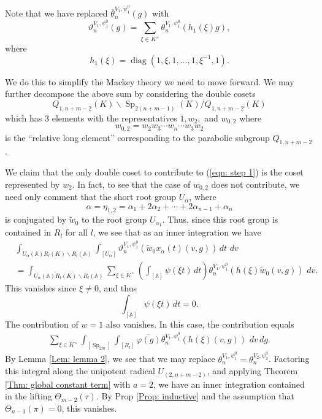 \documentclass[11pt,reqno]{amsart}
\theoremstyle{definition}
\theoremstyle{remark}
\theoremstyle{definition}
\begin{document}
Note that we have replaced $\overline{\theta}_{n}^{V_1,\psi_1^0}(g)$ with
\[
\vartheta^{V_1,\psi_1^0}_{n}(g) = \sum_{\xi\in K^\times}\theta_{n}^{V_1,\psi_1^0}(h_1(\xi)g),
\]
where
\[
h_1(\xi) = \operatorname{diag}(1,\xi,1,\ldots,1,\xi^{-1},1).
\]

 We do this to simplify the Mackey theory we need to move forward. We may further decompose the above sum by considering the double cosets
\[
Q_{1,n+m-2}(K)\backslash\operatorname{Sp}_{2(n+m-1)}(K)/Q_{1,n+m-2}(K)
\]
which has 3 elements with the representatives $1, w_2,$ and $w_{0,2}$ where $$w_{0,2} = w_2w_3\cdots w_n\cdots w_3w_2$$ is the ``relative long element'' corresponding to the  parabolic subgroup $Q_{1,n+m-2}$. 

We claim that the only double coset to contribute to (\ref{eqn: step 1}) is the coset represented by $w_2$. In fact, to see that the case of $w_{0,2}$ does not contribute, we need only comment that the short root group $U_{\alpha}$, where 
\[
{\alpha} = \eta_{1,2} = {\alpha}_1+2{\alpha}_2+\cdots+ 2{\alpha}_{n-1}+{\alpha}_n
\]
is conjugated by $\tilde{w}_0$ to the root group $U_{{\alpha}_1}$. Thus, since this root group is contained in $R_l$ for all $l$, we see that as an inner integration we have
\begin{align*}
&\int_{U_{\alpha}({\mathbb A})R_l(K)\backslash R_l({\mathbb A})}\int_{[U_{\alpha}]}\vartheta^{V_1,\psi_1^0}_{n}(\tilde{w}_0x_{\alpha}(t)(v,g))\,dt\,\,dv\\
&=\int_{U_{\alpha}({\mathbb A})R_l(K)\backslash R_l({\mathbb A})}\sum_{\xi\in K^\times}\left(\int_{[{\mathbb A}]}\psi(\xi t)\,dt\right)\theta^{V_1,\psi_1^0}_{n}(h(\xi)\tilde{w}_0(v,g))\,\,dv.
\end{align*}
This vanishes since $\xi\neq0$, and thus
\[
\int_{[{\mathbb A}]}\psi(\xi t)\,dt=0.
\]
The contribution of $w=1$ also vanishes. In this case, the contribution equals
\begin{align}
\sum_{\xi\in K^\times}\int_{[\operatorname{Sp}_{2m}]}\int_{[R_l]}\overline{\varphi(g)}\theta^{V_1,\psi_1^0}_{n}(h(\xi)(v,g))\,\,dv\,dg.
\end{align}
By Lemma \ref{Lem: lemma 2}, we see that we may replace $\theta_{n}^{V_1,\psi_1^0} = \theta_{n}^{V_2,\psi_2^0}$. Factoring this integral along the unipotent radical $U_{(2,n+m-2)}$, and applying Theorem \ref{Thm: global constant term} with $a=2$, we have an inner integration contained in the lifting $\Theta_{m-2}(\tau)$. By Prop \ref{Prop: inductive} and the assumption that $\Theta_{n-1}(\pi)=0$, this vanishes. 
\end{document}
